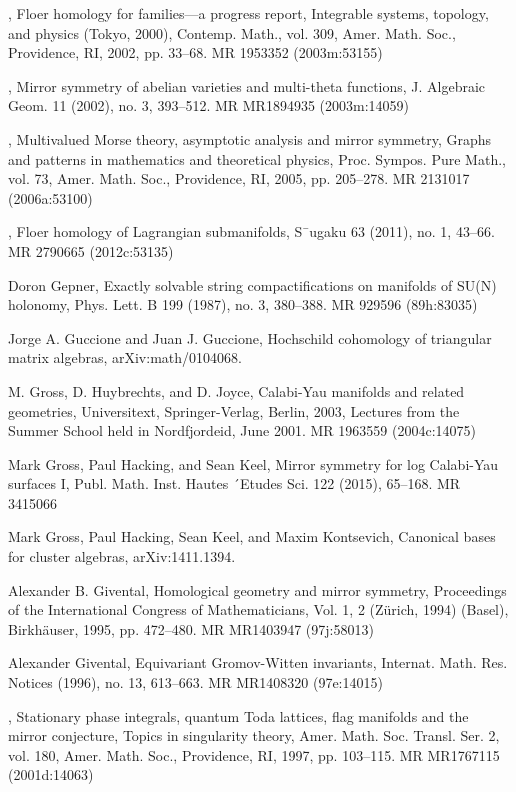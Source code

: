 {\begin{list}{}{%
  \setlength{\leftmargin}{3.4em}%
  \setlength{\itemindent}{-3.4em}%
  \setlength{\itemsep}{1.5pt}%
  \setlength{\parsep}{0pt}%
  \setlength{\listparindent}{0pt}%
}
\item[{[Fuk02b]}] , Floer homology for families---a progress report, Integrable systems, topology, and physics (Tokyo, 2000), Contemp. Math., vol. 309, Amer. Math. Soc., Providence, RI, 2002, pp. 33--68. MR 1953352 (2003m:53155)
\item[{[Fuk02c]}] , Mirror symmetry of abelian varieties and multi-theta functions, J. Algebraic Geom. 11 (2002), no. 3, 393--512. MR MR1894935 (2003m:14059)
\item[{[Fuk05]}] , Multivalued Morse theory, asymptotic analysis and mirror symmetry, Graphs and patterns in mathematics and theoretical physics, Proc. Sympos. Pure Math., vol. 73, Amer. Math. Soc., Providence, RI, 2005, pp. 205--278. MR 2131017 (2006a:53100)
\item[{[Fuk11]}] , Floer homology of Lagrangian submanifolds, S¯ugaku 63 (2011), no. 1, 43--66. MR 2790665 (2012c:53135)
\item[{[Gep87]}] Doron Gepner, Exactly solvable string compactifications on manifolds of SU(N) holonomy, Phys. Lett. B 199 (1987), no. 3, 380--388. MR 929596 (89h:83035)
\item[{[GG]}] Jorge A. Guccione and Juan J. Guccione, Hochschild cohomology of triangular matrix algebras, arXiv:math/0104068.
\item[{[GHJ03]}] M. Gross, D. Huybrechts, and D. Joyce, Calabi-Yau manifolds and related geometries, Universitext, Springer-Verlag, Berlin, 2003, Lectures from the Summer School held in Nordfjordeid, June 2001. MR 1963559 (2004c:14075)
\item[{[GHK15]}] Mark Gross, Paul Hacking, and Sean Keel, Mirror symmetry for log Calabi-Yau surfaces I, Publ. Math. Inst. Hautes ´Etudes Sci. 122 (2015), 65--168. MR 3415066
\item[{[GHKK]}] Mark Gross, Paul Hacking, Sean Keel, and Maxim Kontsevich, Canonical bases for cluster algebras, arXiv:1411.1394.
\item[{[Giv95]}] Alexander B. Givental, Homological geometry and mirror symmetry, Proceedings of the International Congress of Mathematicians, Vol. 1, 2 (Zürich, 1994) (Basel), Birkhäuser, 1995, pp. 472--480. MR MR1403947 (97j:58013)
\item[{[Giv96]}] Alexander Givental, Equivariant Gromov-Witten invariants, Internat. Math. Res. Notices (1996), no. 13, 613--663. MR MR1408320 (97e:14015)
\item[{[Giv97]}] , Stationary phase integrals, quantum Toda lattices, flag manifolds and the mirror conjecture, Topics in singularity theory, Amer. Math. Soc. Transl. Ser. 2, vol. 180, Amer. Math. Soc., Providence, RI, 1997, pp. 103--115. MR MR1767115 (2001d:14063)

\end{list}}
